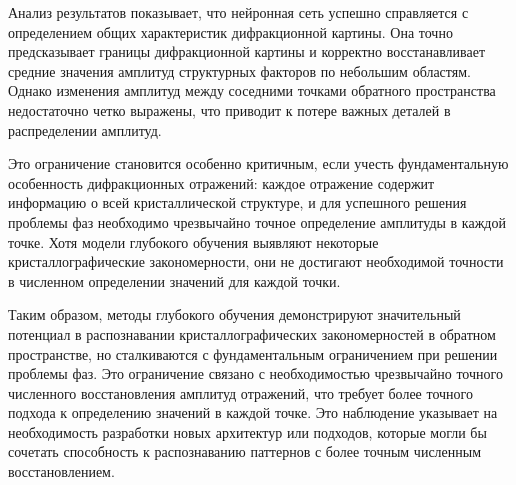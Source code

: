 Анализ результатов показывает, что нейронная сеть успешно справляется с определением общих характеристик дифракционной картины. Она точно предсказывает границы дифракционной картины и корректно восстанавливает средние значения амплитуд структурных факторов по небольшим областям. Однако изменения амплитуд между соседними точками обратного пространства недостаточно четко выражены, что приводит к потере важных деталей в распределении амплитуд. 

Это ограничение становится особенно критичным, если учесть фундаментальную особенность дифракционных отражений: каждое отражение содержит информацию о всей кристаллической структуре, и для успешного решения проблемы фаз необходимо чрезвычайно точное определение амплитуды в каждой точке. Хотя модели глубокого обучения выявляют некоторые кристаллографические закономерности, они не достигают необходимой точности в численном определении значений для каждой точки.

Таким образом, методы глубокого обучения демонстрируют значительный потенциал в распознавании кристаллографических закономерностей в обратном пространстве, но сталкиваются с фундаментальным ограничением при решении проблемы фаз. Это ограничение связано с необходимостью чрезвычайно точного численного восстановления амплитуд отражений, что требует более точного подхода к определению значений в каждой точке. Это наблюдение указывает на необходимость разработки новых архитектур или подходов, которые могли бы сочетать способность к распознаванию паттернов с более точным численным восстановлением.







